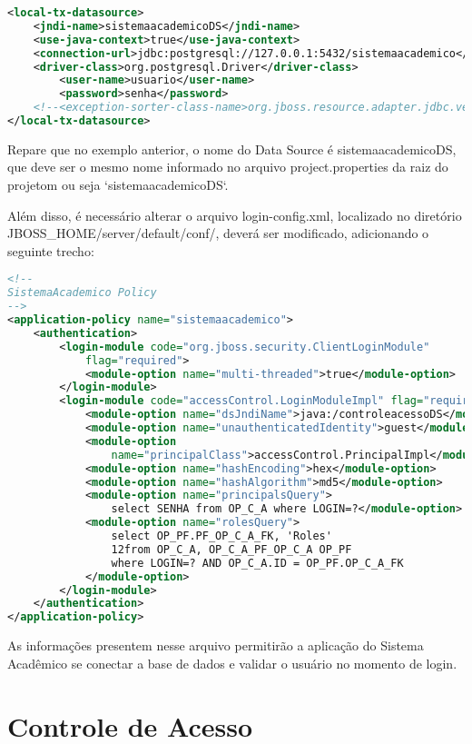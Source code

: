 \begin{lstlisting}[language=xml]
<local-tx-datasource>
	<jndi-name>sistemaacademicoDS</jndi-name>
	<use-java-context>true</use-java-context>
	<connection-url>jdbc:postgresql://127.0.0.1:5432/sistemaacademico</connection-url> 
	<driver-class>org.postgresql.Driver</driver-class>
		<user-name>usuario</user-name>
		<password>senha</password>
	<!--<exception-sorter-class-name>org.jboss.resource.adapter.jdbc.vendor.OracleExceptionSorter</exception-sorter-class-name>-->
</local-tx-datasource>
\end{lstlisting}

Repare que no exemplo anterior, o nome do Data Source é sistemaacademicoDS, que
deve ser o mesmo nome informado no arquivo project.properties da raiz do projetom ou
seja `sistemaacademicoDS`.

Além disso, é necessário alterar o arquivo login-config.xml, localizado no
diretório JBOSS\_HOME/server/default/conf/, deverá ser modificado, adicionando o
seguinte trecho:

\begin{lstlisting}[language=xml]
<!--
SistemaAcademico Policy
-->
<application-policy name="sistemaacademico">
	<authentication>
		<login-module code="org.jboss.security.ClientLoginModule"
			flag="required">
			<module-option name="multi-threaded">true</module-option>
		</login-module>
		<login-module code="accessControl.LoginModuleImpl" flag="required">
			<module-option name="dsJndiName">java:/controleacessoDS</module-option>
			<module-option name="unauthenticatedIdentity">guest</module-option>
			<module-option
				name="principalClass">accessControl.PrincipalImpl</module-option>
			<module-option name="hashEncoding">hex</module-option>
			<module-option name="hashAlgorithm">md5</module-option>
			<module-option name="principalsQuery">
				select SENHA from OP_C_A where LOGIN=?</module-option>
			<module-option name="rolesQuery">
				select OP_PF.PF_OP_C_A_FK, 'Roles'
				12from OP_C_A, OP_C_A_PF_OP_C_A OP_PF
				where LOGIN=? AND OP_C_A.ID = OP_PF.OP_C_A_FK
			</module-option>
		</login-module>
	</authentication>
</application-policy>
\end{lstlisting}

As informações presentem nesse arquivo permitirão a aplicação do Sistema Acadêmico se
conectar a base de dados e validar o usuário no momento de login.

\section{Controle de Acesso}

